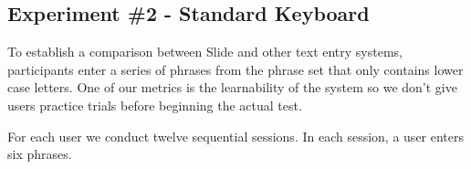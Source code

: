 \subsection{Experiment \#2 - Standard Keyboard}
To establish a comparison between Slide and other text entry systems, participants enter a series of phrases from the phrase set that only contains lower case letters.
One of our metrics is the learnability of the system so we don't give users practice trials before beginning the actual test.

For each user we conduct twelve sequential sessions.
In each session, a user enters six phrases.


